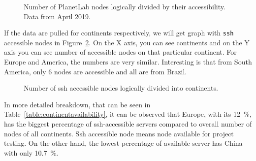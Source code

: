 {{{{{{{\begin{figure}[H]
	\centering
	\caption{Number of PlanetLab nodes logically divided by their accessibility. Data from April 2019.}
	\label{fig:nodestats}
\end{figure}

If the data are pulled for continents respectively, we will get graph with \texttt{ssh} accessible nodes in Figure~\ref{fig:sshcountriesgraph}. On the X axis, you can see continents and on the Y axis you can see number of accessible nodes on that particular continent. For Europe and America, the numbers are very similar. Interesting is that from South America, only 6 nodes are accessible and all are from Brazil.

\begin{figure}[H]
	\centering
	\caption{Number of ssh accessible nodes logically divided into continents.}
	\label{fig:sshcountriesgraph}
\end{figure}

In more detailed breakdown, that can be seen in  Table~\ref{table:continentavailability}, it can be observed that Europe, with its \SI{12}{\percent}, has the biggest percentage of ssh-accessible servers compared to overall number of nodes of all continents. Ssh accessible node means node available for project testing. On the other hand, the lowest percentage of available server has China with only \SI{10.7}{\percent}.

}}}}}}}
